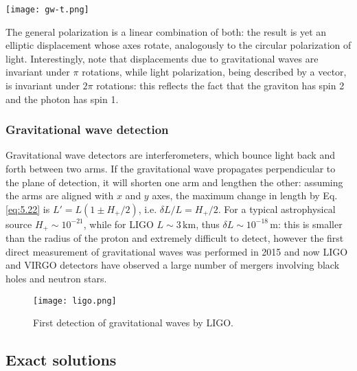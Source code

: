 \begin{figure*}[h]
  \centering
  \texttt{[image: gw-t.png]}
\end{figure*}

The general polarization is a linear combination of both: the result is yet an elliptic displacement whose axes rotate, analogously to the circular polarization of light. Interestingly, note that displacements due to gravitational waves are invariant under $ \pi $ rotations, while light polarization, being described by a vector, is invariant under $ 2\pi $ rotations: this reflects the fact that the graviton has spin 2 and the photon has spin 1.

\subsubsection{Gravitational wave detection}

Gravitational wave detectors are interferometers, which bounce light back and forth between two arms. If the gravitational wave propagates perpendicular to the plane of detection, it will shorten one arm and lengthen the other: assuming the arms are aligned with $ x $ and $ y $ axes, the maximum change in length by Eq. \ref{eq:5.22} is $ L' = L (1 \pm H_+ / 2) $, i.e. $ \delta L / L = H_+ / 2 $.
For a typical astrophysical source $ H_+ \sim 10^{-21} $, while for LIGO $ L \sim 3\,\text{km} $, thus $ \delta L \sim 10^{-18} \,\text{m} $: this is smaller than the radius of the proton and extremely difficult to detect, however the first direct measurement of gravitational waves was performed in 2015 and now LIGO and VIRGO detectors have observed a large number of mergers involving black holes and neutron stars.

\begin{figure}[h]
  \centering
  \texttt{[image: ligo.png]}
  \caption{First detection of gravitational waves by LIGO.}
  \label{ligo}
\end{figure}

\subsection{Exact solutions}


